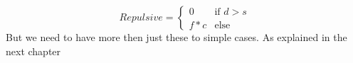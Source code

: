 		\begin{displaymath}
			Repulsive = \begin{cases}
					0 & \text{if $d > s$}\\
					f * c & \text{else}
				\end{cases}		
		\end{displaymath}
		But we need to have more then just these to simple cases. As explained in the next chapter
		
		
